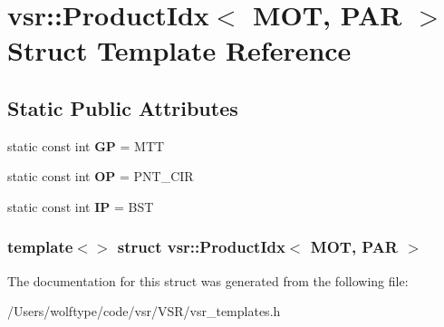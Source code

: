 \hypertarget{structvsr_1_1_product_idx_3_01_m_o_t_00_01_p_a_r_01_4}{\section{vsr\-:\-:Product\-Idx$<$ M\-O\-T, P\-A\-R $>$ Struct Template Reference}
\label{structvsr_1_1_product_idx_3_01_m_o_t_00_01_p_a_r_01_4}
}
\subsection*{Static Public Attributes}
\begin{DoxyCompactItemize}
\item 
\hypertarget{structvsr_1_1_product_idx_3_01_m_o_t_00_01_p_a_r_01_4_a69296d03e613e1e8dcca7db6f35526bf}{static const int {\bfseries G\-P} = M\-T\-T}\label{structvsr_1_1_product_idx_3_01_m_o_t_00_01_p_a_r_01_4_a69296d03e613e1e8dcca7db6f35526bf}

\item 
\hypertarget{structvsr_1_1_product_idx_3_01_m_o_t_00_01_p_a_r_01_4_af66fcb33320c519b782ad6bd392538c0}{static const int {\bfseries O\-P} = P\-N\-T\-\_\-\-C\-I\-R}\label{structvsr_1_1_product_idx_3_01_m_o_t_00_01_p_a_r_01_4_af66fcb33320c519b782ad6bd392538c0}

\item 
\hypertarget{structvsr_1_1_product_idx_3_01_m_o_t_00_01_p_a_r_01_4_ac413f2e6bf54953f01a94639cdd9c752}{static const int {\bfseries I\-P} = B\-S\-T}\label{structvsr_1_1_product_idx_3_01_m_o_t_00_01_p_a_r_01_4_ac413f2e6bf54953f01a94639cdd9c752}

\end{DoxyCompactItemize}
\subsubsection*{template$<$$>$ struct vsr\-::\-Product\-Idx$<$ M\-O\-T, P\-A\-R $>$}



The documentation for this struct was generated from the following file\-:\begin{DoxyCompactItemize}
\item 
/\-Users/wolftype/code/vsr/\-V\-S\-R/vsr\-\_\-templates.\-h\end{DoxyCompactItemize}
